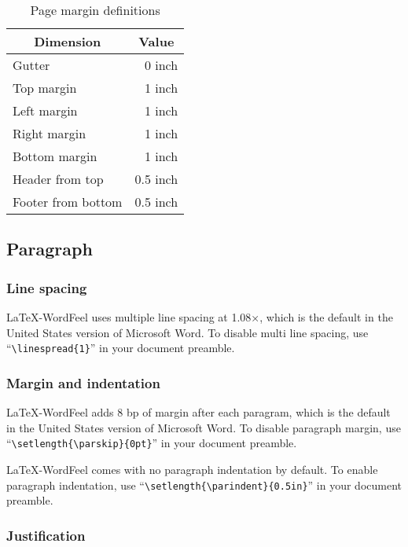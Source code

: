 \documentclass[letterpaper]{wordfeel}
\begin{document}
\begin{table}[htb]
    \centering
    \caption{Page margin definitions}
    \label{tab:page-margin}
    \begin{tabular}{lr}
        \toprule
        \multicolumn{1}{c}{Dimension} & \multicolumn{1}{c}{Value} \\
        \midrule
        Gutter & 0 inch \\
        Top margin & 1 inch \\
        Left margin & 1 inch \\
        Right margin & 1 inch \\
        Bottom margin & 1 inch \\
        Header from top & 0.5 inch \\
        Footer from bottom & 0.5 inch \\
        \bottomrule
    \end{tabular}
\end{table}

\FloatBarrier

\subsection{Paragraph}

\subsubsection{Line spacing}

\LaTeX-WordFeel uses multiple line spacing at 1.08×, which is the default in the United States version of Microsoft Word. To disable multi line spacing, use ``\texttt{\textbackslash{}linespread\{1\}}'' in your document preamble.

\subsubsection{Margin and indentation}

\LaTeX-WordFeel adds 8 bp of margin after each paragram, which is the default in the United States version of Microsoft Word. To disable paragraph margin, use ``\texttt{\textbackslash{}setlength\{\textbackslash{}parskip\}\{0pt\}}'' in your document preamble.

\LaTeX-WordFeel comes with no paragraph indentation by default. To enable paragraph indentation, use ``\texttt{\textbackslash{}setlength\{\textbackslash{}parindent\}\{0.5in\}}'' in your document preamble.

\subsubsection{Justification}
\end{document}
